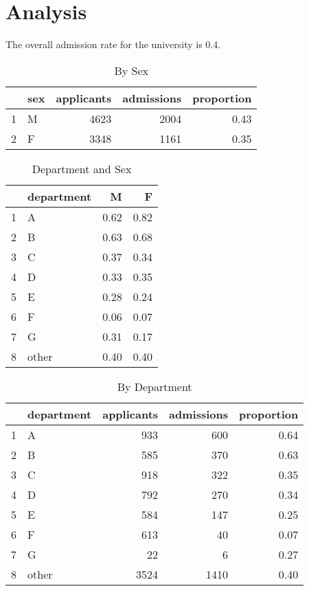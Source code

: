 \documentclass[letterpaper, landscape]{exam}
\begin{document}
  \ifprintanswers
    \pagebreak
    \section{Analysis}

    The overall admission rate for the university is 0.4.

    \begin{table}[ht]
      \centering
      \begin{tabular}{rlrrr}
        \toprule
          & sex & applicants & admissions & proportion \\
        \midrule
        1 & M   & 4623       & 2004       & 0.43 \\
        2 & F   & 3348       & 1161       & 0.35 \\
        \bottomrule
      \end{tabular}
      \caption{By Sex}
    \end{table}
  
    \begin{table}[ht]
      \centering
      \begin{tabular}{rlrr}
        \toprule
           & department & M    & F \\
        \midrule
        1  & A          & 0.62 & 0.82 \\
        2  & B          & 0.63 & 0.68 \\
        3  & C          & 0.37 & 0.34 \\
        4  & D          & 0.33 & 0.35 \\
        5  & E          & 0.28 & 0.24 \\
        6  & F          & 0.06 & 0.07 \\
        7  & G          & 0.31 & 0.17 \\
        8  & other      & 0.40 & 0.40 \\
        \bottomrule
      \end{tabular}
      \caption{Department and Sex}
    \end{table}

    \begin{table}[H]
      \centering
      \begin{tabular}{rlrrr}
        \toprule
          & department & applicants & admissions & proportion \\
        \midrule
        1 & A          & 933        & 600        & 0.64 \\
        2 & B          & 585        & 370        & 0.63 \\
        3 & C          & 918        & 322        & 0.35 \\
        4 & D          & 792        & 270        & 0.34 \\
        5 & E          & 584        & 147        & 0.25 \\
        6 & F          & 613        & 40         & 0.07 \\
        7 & G          & 22         & 6          & 0.27 \\
        8 & other      & 3524       & 1410       & 0.40 \\
        \bottomrule
      \end{tabular}
      \caption{By Department}
    \end{table}
  \fi
\end{document}

